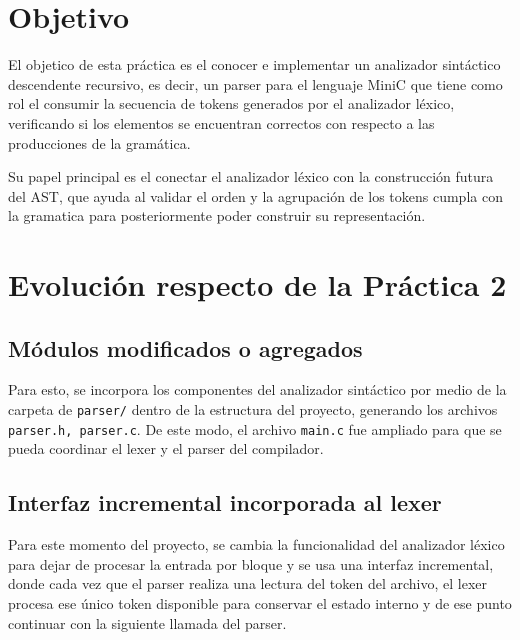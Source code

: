 \documentclass[12pt]{article}
\begin{document}

\clearpage
\pagestyle{fancy}
\renewcommand{\headrulewidth}{0.4pt} %
\renewcommand{\footrulewidth}{0.4pt} %

\cfoot{\thepage}

\section{Objetivo}

El objetico de esta práctica es el conocer e implementar un analizador sintáctico descendente
recursivo, es decir, un parser para el lenguaje MiniC que tiene como rol el consumir
la secuencia de tokens generados por el analizador léxico, verificando si los elementos 
se encuentran correctos con respecto a las producciones de la gramática.

Su papel principal es el conectar el analizador léxico con la construcción futura del AST,
que ayuda al validar el orden y la agrupación de los tokens cumpla con la gramatica
para posteriormente poder construir su representación.

\section{Evolución respecto de la Práctica 2}

\subsection{Módulos modificados o agregados}

Para esto, se incorpora los componentes del analizador sintáctico por medio de la carpeta de
\texttt{parser/} dentro de la estructura del proyecto, generando los archivos \texttt{parser.h, 
parser.c}. De este modo, el archivo \texttt{main.c} fue ampliado para que se pueda
coordinar el lexer y el parser del compilador.

\subsection{Interfaz incremental incorporada al lexer}

Para este momento del proyecto, se cambia la funcionalidad del analizador léxico para dejar de procesar
la entrada por bloque y se usa una interfaz incremental, donde cada vez que el parser realiza
una lectura del token del archivo, el lexer procesa ese único token disponible para conservar el estado
interno y de ese punto continuar con la siguiente llamada del parser.
\end{document}
